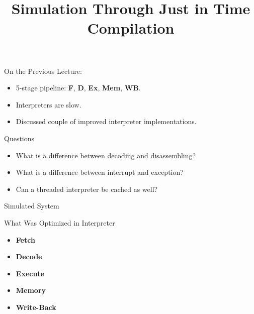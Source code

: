 


\usepackage{tikz}
\usetikzlibrary{shapes, calc, arrows, decorations.markings, decorations.pathreplacing, decorations.pathmorphing, decorations, patterns, chains, snakes, backgrounds, positioning, fit, shadows}

\title{Simulation Through Just in Time Compilation}



\startslides

\begin{frame}{On the Previous Lecture:}
\begin{itemize}
\item 5-stage pipeline: \textbf{F}, \textbf{D}, \textbf{Ex}, \textbf{Mem},
  \textbf{WB}.
\item Interpreters are slow.
\item Discussed couple of improved interpreter implementations.
\end{itemize}
\end{frame}

\begin{frame}{Questions}
\begin{itemize}
\item What is a difference between decoding and disassembling?\pause
\item What is a difference between interrupt and exception?\pause
\item Can a threaded interpreter be cached as well?
\end{itemize}
\end{frame}

\begin{frame}{Simulated System}
\centering
\vfill
{}
\vfill
\end{frame}

\begin{frame}{What Was Optimized in Interpreter}
\begin{itemize}
\item \textbf<1>{Fetch} \only<1>{$\leftarrow$ optimized}
\item \textbf<1>{Decode} 
\item \textbf<2>{Execute} 
\item \textbf<2>{Memory} 
\item \textbf<2>{Write-Back} 
\end{itemize}
\end{frame}

